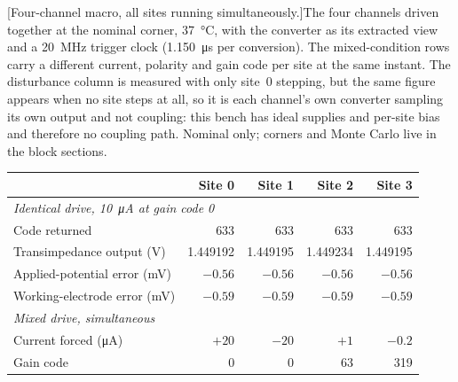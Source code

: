 \par\addvspace{\intextsep}
\noindent\parbox[b]{\textwidth}{%
  [{Four-channel macro, all sites running simultaneously.}]{The
  four channels driven together at the nominal corner, \SI{37}{\celsius}, with
  the converter as its extracted view and a \SI{20}{\mega\hertz} trigger clock
  (\SI{1.150}{\micro\second} per conversion). The mixed-condition rows carry a
  different current, polarity and gain code per site at the same instant. The
  disturbance column is measured with only site~0 stepping, but the same figure
  appears when no site steps at all, so it is each channel's own converter
  sampling its own output and not coupling: this bench has ideal supplies and
  per-site bias and therefore no coupling path. Nominal only; corners and Monte
  Carlo live in the block sections.}%
  \label{tab:quad-tb09}%
  \par\nobreak
  \centering
  \begin{tabular}{lrrrr}
    \toprule
    & Site 0 & Site 1 & Site 2 & Site 3 \\
    \midrule
    \multicolumn{5}{l}{\emph{Identical drive, \SI{10}{\micro\ampere} at gain code 0}} \\
    Code returned                   & 633 & 633 & 633 & 633 \\
    Transimpedance output (\si{\volt}) & 1.449192 & 1.449195 & 1.449234 & 1.449195 \\
    Applied-potential error (\si{\milli\volt}) & \(-0.56\) & \(-0.56\) & \(-0.56\) & \(-0.56\) \\
    Working-electrode error (\si{\milli\volt}) & \(-0.59\) & \(-0.59\) & \(-0.59\) & \(-0.59\) \\
    \midrule
    \multicolumn{5}{l}{\emph{Mixed drive, simultaneous}} \\
    Current forced (\si{\micro\ampere}) & \(+20\) & \(-20\) & \(+1\) & \(-0.2\) \\
    Gain code                       & 0 & 0 & 63 & 319 \\

\end{tabular}}
